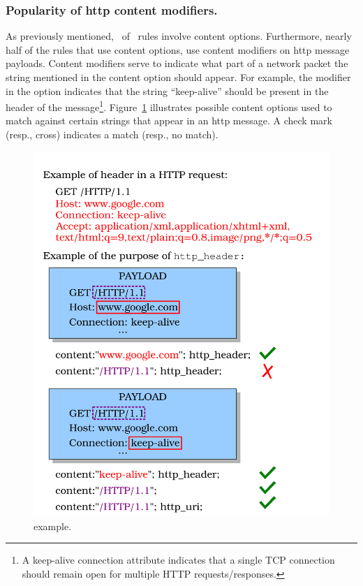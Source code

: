\documentclass[sigconf,review, anonymous]{acmart}
\begin{document}
\subsubsection{Popularity of http content modifiers.} As previously
mentioned, \percRulesWithContent\ of \suri\ rules involve content
options. Furthermore, nearly half of the rules that use content
options, use content modifiers on http message payloads. Content
modifiers serve to indicate what part of a network packet the string
mentioned in the content option should appear. For example, the
modifier  in the option  indicates that the string
``keep-alive'' should be present in the header of the
message\footnote{A keep-alive connection attribute indicates that a
  single TCP connection should remain open for multiple HTTP
  requests/responses.}.  Figure~\ref{fig:http-header-example}
illustrates possible content options used to match against certain
strings that appear in an http message. A check mark (resp., cross)
indicates a match (resp., no match).

\begin{figure}[t!]
\centering
\includegraphics[scale=0.5]{figs/http_header-example.png}
\caption{ example.}
\label{fig:http-header-example}
\end{figure}
\end{document}
